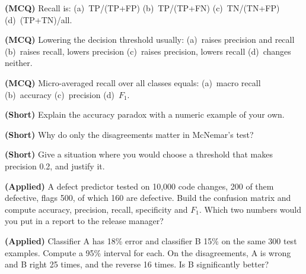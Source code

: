 \begin{reviewq}
  \item \textbf{(MCQ)} Recall is: (a)~TP/(TP+FP) (b)~TP/(TP+FN) (c)~TN/(TN+FP)
        (d)~(TP+TN)/all.
  \item \textbf{(MCQ)} Lowering the decision threshold usually: (a)~raises
        precision and recall (b)~raises recall, lowers precision (c)~raises
        precision, lowers recall (d)~changes neither.
  \item \textbf{(MCQ)} Micro-averaged recall over all classes equals:
        (a)~macro recall (b)~accuracy (c)~precision (d)~$F_1$.
  \item \textbf{(Short)} Explain the accuracy paradox with a numeric example of
        your own.
  \item \textbf{(Short)} Why do only the disagreements matter in McNemar's test?
  \item \textbf{(Short)} Give a situation where you would choose a threshold that
        makes precision 0.2, and justify it.
  \item \textbf{(Applied)} A defect predictor tested on 10{,}000 code changes, 200
        of them defective, flags 500, of which 160 are defective. Build the
        confusion matrix and compute accuracy, precision, recall, specificity and
        $F_1$. Which two numbers would you put in a report to the release
        manager?
  \item \textbf{(Applied)} Classifier A has 18\% error and classifier B 15\% on the
        same 300 test examples. Compute a 95\% interval for each. On the
        disagreements, A is wrong and B right 25 times, and the reverse 16
        times. Is B significantly better?
\end{reviewq}
